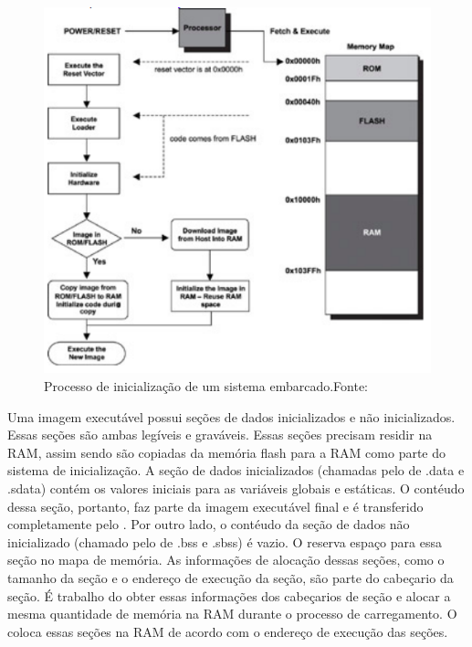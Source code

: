 \begin{figure}[H]
    \scriptsize
     \centering
     \includegraphics[scale=1]{dados/figuras/InicializacaoBoot.png}
     \caption{Processo de inicialização de um sistema embarcado.\newline Fonte:\cite{Qing2003}}
     \label{fig:INICIALIZAÇÃO}
\end{figure}

Uma imagem executável possui seções de dados inicializados e não inicializados. Essas seções são ambas legíveis e graváveis. Essas seções precisam residir na RAM, assim sendo são copiadas da memória flash para a RAM como parte do sistema de inicialização. A seção de dados inicializados (chamadas pelo \linker de .data e .sdata) contém os valores iniciais para as variáveis globais e estáticas. O contéudo dessa seção, portanto, faz parte da imagem executável final e é transferido completamente pelo \loader. Por outro lado, o contéudo da seção de dados não inicializado (chamado pelo \linker de .bss e .sbss) é vazio. O \linker reserva espaço para essa seção no mapa de memória. As informações de alocação dessas seções, como o tamanho da seção e o endereço de execução da seção, são parte do cabeçario da seção. É trabalho do \loader obter essas informações dos cabeçarios de seção e alocar a mesma quantidade de memória na RAM durante o processo de carregamento. O \loader coloca essas seções na RAM de acordo com o endereço de execução das seções.

